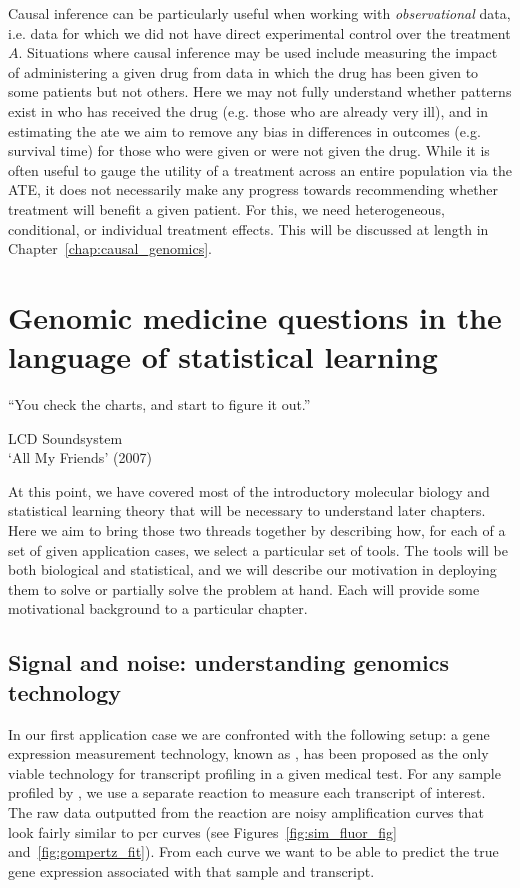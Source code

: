 \documentclass[thesis.tex]{subfiles}
\begin{document}
Causal inference can be particularly useful when working with \emph{observational} data, i.e. data for which we did not have direct experimental control over the treatment $A$. Situations where causal inference may be used include measuring the impact of administering a given drug from data in which the drug has been given to some patients but not others. Here we may not fully understand whether patterns exist in who has received the drug (e.g. those who are already very ill), and in estimating the \gls{ate} we aim to remove any bias in differences in outcomes (e.g. survival time) for those who were given or were not given the drug. While it is often useful to gauge the utility of a treatment across an entire population via the ATE, it does not necessarily make any progress towards recommending whether treatment will benefit a given patient. For this, we need heterogeneous, conditional, or individual treatment effects. This will be discussed at length in Chapter~\ref{chap:causal_genomics}.

\section{Genomic medicine questions in the language of statistical learning} \label{sec:questions}
\epigraph{``You check the charts, and start to figure it out.''}{LCD Soundsystem \\`All My Friends' (2007)}


At this point, we have covered most of the introductory molecular biology and statistical learning theory that will be necessary to understand later chapters. Here we aim to bring those two threads together by describing how, for each of a set of given application cases, we select a particular set of tools. The tools will be both biological and statistical, and we will describe our motivation in deploying them to solve or partially solve the problem at hand. Each will provide some motivational background to a particular chapter.

\subsection{Signal and noise: understanding genomics technology}
In our first application case we are confronted with the following setup: a gene expression measurement technology, known as , has been proposed as the only viable technology for transcript profiling in a given medical test. For any sample profiled by , we use a separate reaction to measure each transcript of interest. The raw data outputted from the  reaction are noisy amplification curves that look fairly similar to \gls{pcr} curves (see Figures~\ref{fig:sim_fluor_fig} and~\ref{fig:gompertz_fit}). From each curve we want to be able to predict the true gene expression associated with that sample and transcript.
\end{document}
